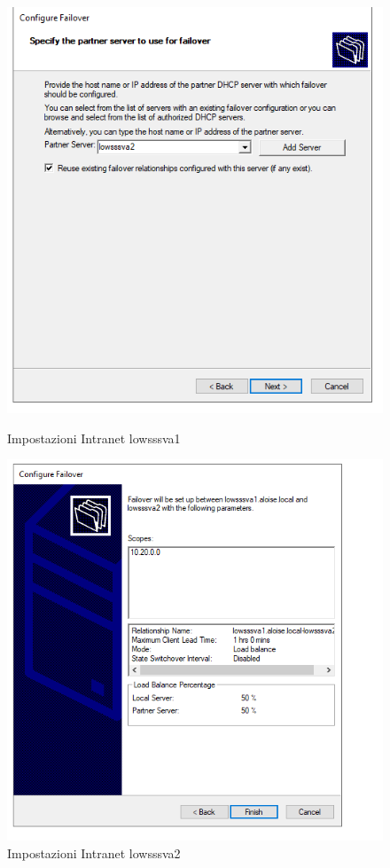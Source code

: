 \documentclass[../main.tex]{subfiles}
\begin{document}
\begin{figure}[h]
  \centering
  \begin{minipage}[h]{0.45\textwidth}
    \includegraphics[width=\textwidth]{Images/dhcp2.PNG}
    \caption{Impostazioni Intranet lowsssva1}
  \end{minipage}
  \hfill
  \begin{minipage}[h]{0.45\textwidth}
    \includegraphics[width=\textwidth]{Images/dhcp3.PNG}
    \caption{Impostazioni Intranet lowsssva2}
  \end{minipage}
\end{figure}
\end{document}

